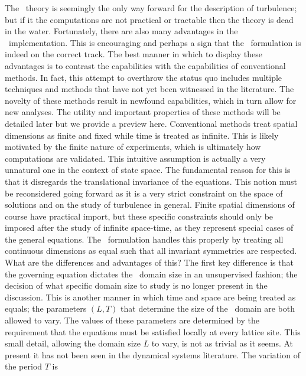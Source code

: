 The \spt\ theory is seemingly the only way forward for
the description of turbulence; but if it the computations
are not practical or tractable then the theory is dead in
the water. Fortunately, there are also many advantages in the
\spt\ implementation. This is encouraging and perhaps
a sign that the \spt\ formulation is indeed on the correct track.
The best manner in which to display these advantages
is to contrast the capabilities with the capabilities of
conventional methods.
In fact, this attempt to overthrow the status quo includes multiple techniques
and methods that have not yet been witnessed in the literature.
The novelty of these methods result in newfound capabilities, which in turn allow for
new analyses. The utility and important properties of these methods
will be detailed later but we provide a preview here.
Conventional methods treat spatial dimensions
as finite and fixed while time is treated as infinite.
This is likely motivated by the finite nature of experiments,
which is ultimately how computations are validated.
This intuitive assumption is actually a very unnatural one
in the context of state space. The fundamental reason
for this is that it disregards
the translational invariance of the equations. This notion
must be reconsidered going forward as it is a very strict constraint
on the space of solutions and on the study of turbulence in general.
Finite spatial dimensions of course have practical import, but
these specific constraints should only be imposed after the
study of infinite space-time, as they represent special
cases of the general equations. The \spt\ formulation handles
this properly by treating all continuous dimensions as equal
such that all invariant symmetries are respected.
What are the differences and advantages of this?
The first key difference is that the governing equation
dictates the \spt\ domain size in an unsupervised
fashion; the decision of what specific domain size
to study is no longer present in the discussion.
This is another manner in which
time and space are being treated as equals; the parameters $(L,T)$
that determine the size of the \spt\ domain are both allowed to vary.
The values of these parameters
are determined by the requirement that the equations
must be satisfied locally at every lattice site.
This small detail, allowing the domain size $L$ to vary,
is not as trivial as it seems. At present it has not been seen in
the dynamical systems literature. The variation of the period $T$ is
